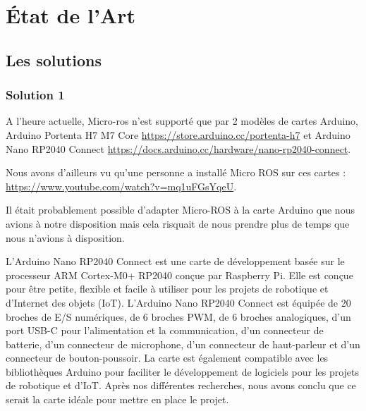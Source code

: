 	\chapter{État de l'Art}
	\thispagestyle{empty}

		\section{Les solutions}

			\subsection{Solution 1}

A l’heure actuelle, Micro-ros n’est supporté que par 2 modèles de cartes Arduino, Arduino Portenta H7 M7 Core
\url{https://store.arduino.cc/portenta-h7} et Arduino Nano RP2040 Connect \url{https://docs.arduino.cc/hardware/nano-rp2040-connect}. 

Nous avons d'ailleurs vu qu'une personne a installé Micro ROS sur ces cartes : \url{https://www.youtube.com/watch?v=mq1uFGsYqeU}.

Il était probablement possible d’adapter Micro-ROS à la carte Arduino que nous avions à notre disposition mais cela risquait de nous 
prendre plus de temps que nous n’avions à disposition.  
\linebreak
	
L'Arduino Nano RP2040 Connect est une carte de développement basée sur le processeur ARM Cortex-M0+ RP2040 conçue par Raspberry Pi. 
Elle est conçue pour être petite, flexible et facile à utiliser pour les projets de robotique et d'Internet des objets (IoT). 
L'Arduino Nano RP2040 Connect est équipée de 20 broches de E/S numériques, de 6 broches PWM, de 6 broches analogiques, 
d'un port USB-C pour l'alimentation et la communication, d'un connecteur de batterie, d'un connecteur de microphone, 
d'un connecteur de haut-parleur et d'un connecteur de bouton-poussoir. La carte est également compatible avec les bibliothèques Arduino 
pour faciliter le développement de logiciels pour les projets de robotique et d'IoT. 
Après nos différentes recherches, nous avons conclu que ce serait la carte idéale pour mettre en place le projet.
\linebreak 

